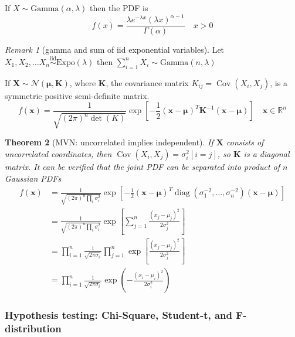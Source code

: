 \documentclass{article}
\newtheorem{theorem}{Theorem}[section]
\theoremstyle{definition}
\theoremstyle{remark}
\newtheorem{remark}[theorem]{Remark}
\newcommand{\Cov}{\operatorname{Cov}}
\newcommand{\Expo}{\mathrm{Expo}}
\newcommand{\Norm}{\mathcal{N}}
\newcommand{\GammaD}{\mathrm{Gamma}}
\newcommand{\dist}{\sim}
\newcommand{\iid}{\stackrel{\mathrm{iid}}{\dist}}
\begin{document}
If \(X\dist\GammaD(\alpha,\lambda)\) then the PDF is
\[
	f(x) = \frac{
		\lambda e^{-\lambda x} {(\lambda x)}^{\alpha -1}
	}
	{\Gamma(\alpha)}
	\quad x>0
\]

\begin{remark}[gamma and sum of iid exponential variables]
	Let \(X_1,X_2,\ldots X_n\iid\Expo(\lambda)\) then
	\(\sum_{i=1}^n X_i \dist \GammaD(n,\lambda)\)
\end{remark}



If \(\mathbf{X}\dist\Norm(\mathbf{\mu},\mathbf{K})\), where \(\mathbf{K}\), the covariance matrix \(K_{ij}=\Cov(X_i,X_j)\), is a symmetric positive semi-definite matrix.
\[
	f(\mathbf{x}) = \frac{1}{\sqrt{{(2\pi)}^n \det(K)}}
	\exp\left[
	- \frac12
	{(\mathbf{x}- \mathbf\mu)}^T \mathbf{K}^{-1} {(\mathbf{x}- \mathbf\mu)}
	\right]
	\quad \mathbf{x} \in \mathbb{R}^n
\]

\begin{theorem}[MVN: uncorrelated implies independent]
	If \(\mathbf{X}\) consists of uncorrelated coordinates, then \(\Cov(X_i,X_j) = \sigma^2_i [i=j]\), so \(\mathbf{K}\) is a diagonal matrix.
	It can be verified that the joint PDF can be separated into product of \(n\) Gaussian PDFs
	\begin{align*}
		f(\mathbf{x}) & = \frac{1}{\sqrt{{(2\pi)}^n \prod_i \sigma_i^2 }} \exp\left[ -\frac12
			{(\mathbf{x}- \mathbf\mu)}^T \operatorname{diag}(\sigma_1^{-2},\ldots,\sigma_n^{-2}) {(\mathbf{x}- \mathbf\mu)}
		\right]                                                                                                              \\
		              & = \frac{1}{\sqrt{{(2\pi)}^n \prod_i \sigma_i^2 }} \exp\left[
			\sum_{j=1}^n \frac{{(x_j-\mu_j)}^2}{2\sigma_j^2}
		\right]                                                                                                              \\
		              & = \prod_{i=1}^n \frac{1}{\sqrt{2\pi \sigma_i}} \prod_{j=1}^n \exp\left[
			\frac{{(x_j-\mu_j)}^2}{2\sigma_j^2}
		\right]                                                                                                              \\
		              & = \prod_{i=1}^n \frac{1}{\sqrt{2\pi \sigma_i}} \exp\left(-\frac{{(x_i-\mu_i)}^2}{2\sigma_i^2}\right)
	\end{align*}
\end{theorem}


\subsubsection{Hypothesis testing: Chi-Square, Student-t, and F-distribution}
\end{document}
